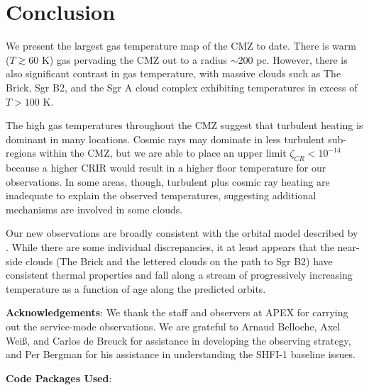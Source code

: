 \section{Conclusion}
We present the largest gas temperature map of the CMZ to date.  There is warm
($T\gtrsim60$ K) gas pervading the CMZ out to a radius $\sim200$ pc.  However,
there is also significant contrast in gas temperature, with massive clouds such
as The Brick, Sgr B2, and the Sgr A cloud complex exhibiting temperatures in
excess of $T>100$ K.

The high gas temperatures throughout the CMZ suggest that turbulent heating is
dominant in many locations.  Cosmic rays may dominate in less turbulent
sub-regions within the CMZ, but we are able to place an upper limit $\zeta_{CR}
< 10^{-14}$ \pers because a higher CRIR would result in a higher floor
temperature for our observations.  In some areas, though, turbulent plus cosmic
ray heating are inadequate to explain the observed temperatures, suggesting
additional mechanisms are involved in some clouds.

Our new observations are broadly consistent with the orbital model described by
\citet{Kruijssen2015a}.  While there are some individual discrepancies, it at
least appears that the near-side clouds (The Brick and the lettered clouds on
the path to Sgr B2) have consistent thermal properties and fall along a stream
of progressively increasing temperature as a function of age along the
predicted orbits.  


\textbf{Acknowledgements}:
We thank the staff and observers at APEX for carrying out the service-mode
observations.  We are grateful to Arnaud Belloche, Axel Weiß, and Carlos de
Breuck for assistance in developing the observing strategy, and Per Bergman for
his assistance in understanding the SHFI-1 baseline issues.

\textbf{Code Packages Used}:


